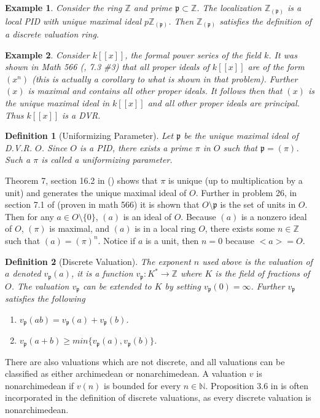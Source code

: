 \documentclass[paper=a4, fontsize=11pt]{scrartcl} %
\numberwithin{equation}{section} %
\numberwithin{figure}{section} %
\numberwithin{table}{section} %
\theoremstyle{break}
\newtheorem{defn}{Definition}
\newtheorem{ex}{Example}
\begin{document}
\begin{ex} Consider the ring $\mathbb{Z}$ and prime $\mathfrak{p}\subset \mathbb{Z}$. The localization $\mathbb{Z}_{(\mathfrak{p})}$ is a local PID with unique maximal ideal $p\mathbb{Z}_{(\mathfrak{p})}$. Then $\mathbb{Z}_{(\mathfrak{p})}$ satisfies the definition of a discrete valuation ring.
\end{ex}
\begin{ex} Consider $k[[x]]$, the formal power series of the field $k$. It was shown in Math 566 (\cite{DnF}, 7.3 \#3) that all proper ideals of $k[[x]]$ are of the form $(x^n)$ (this is actually a corollary to what is shown in that problem). Further $(x)$ is maximal and contains all other proper ideals. It follows then that $(x)$ is the unique maximal ideal in $k[[x]]$ and all other proper ideals are principal. Thus $k[[x]]$ is a DVR.
\end{ex}
\begin{defn}[Uniformizing Parameter]
Let $\mathfrak{p}$ be the unique maximal ideal of D.V.R. $O$. Since $O$ is a PID, there exists a prime $\pi$ in $O$ such that $\mathfrak{p}=(\pi)$. Such a $\pi$ is called a uniformizing parameter.
\end{defn}
Theorem 7, section 16.2 in (\cite{DnF}) shows that $\pi$ is unique (up to multiplication by a unit) and generates the unique maximal ideal of $O$. Further in problem 26, in section 7.1 of \cite{DnF} (proven in math 566) it is shown that $O \setminus \mathfrak{p}$ is the set of units in $O$. Then for any $a\in O\setminus \{0\}$, $(a)$ is an ideal of $O$. Because $(a)$ is a nonzero ideal of $O$, $(\pi)$ is maximal, and $(a)$ is in a local ring $O$, there exists some $n\in \mathbb{Z}$ such that $(a) = (\pi)^n$. Notice if $a$ is a unit, then $n=0$ because $<a>=O$. 
\begin{defn}[Discrete Valuation]
The exponent $n$ used above is the valuation of $a$ denoted $v_\mathfrak{p}(a)$, it is a function $v_\mathfrak{p}:K^* \to \mathbb{Z}$ where $K$ is the field of fractions of $O$. The valuation $v_\mathfrak{p}$ can be extended to $K$ by setting $v_\mathfrak{p}(0) = \infty$. Further $v_\mathfrak{p}$ satisfies the following
\begin{enumerate}
\item $v_\mathfrak{p}(ab)=v_\mathfrak{p}(a) + v_\mathfrak{p}(b)$.
\item $v_\mathfrak{p}(a+b) \geq min\{v_\mathfrak{p}(a),v_\mathfrak{p}(b) \}$.
\end{enumerate}
\end{defn}
There are also valuations which are not discrete, and all valuations can be classified as either archimedean or nonarchimedean. A valuation $v$ is nonarchimedean if $v(n)$ is bounded for every $n\in \mathbb{N}$. Proposition 3.6 in \cite{Neukirch} is often incorporated in the definition of discrete valuations, as every discrete valuation is nonarchimedean.
\end{document}
